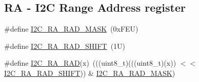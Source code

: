 \subsection*{RA -\/ I2C Range Address register}
\begin{DoxyCompactItemize}
\item 
\#define \mbox{\hyperlink{group___i2_c___register___masks_gaa39c37c0d41e4cdafc00884a2fc791fa}{I2\+C\+\_\+\+R\+A\+\_\+\+R\+A\+D\+\_\+\+M\+A\+SK}}~(0x\+F\+E\+U)
\item 
\#define \mbox{\hyperlink{group___i2_c___register___masks_ga8571ae2c33f4ea6503f568c2151ef2a9}{I2\+C\+\_\+\+R\+A\+\_\+\+R\+A\+D\+\_\+\+S\+H\+I\+FT}}~(1\+U)
\item 
\#define \mbox{\hyperlink{group___i2_c___register___masks_gae2a3d76c69fe5e8947660274f6744031}{I2\+C\+\_\+\+R\+A\+\_\+\+R\+AD}}(x)~(((uint8\+\_\+t)(((uint8\+\_\+t)(x)) $<$$<$ \mbox{\hyperlink{group___i2_c___register___masks_ga8571ae2c33f4ea6503f568c2151ef2a9}{I2\+C\+\_\+\+R\+A\+\_\+\+R\+A\+D\+\_\+\+S\+H\+I\+FT}})) \& \mbox{\hyperlink{group___i2_c___register___masks_gaa39c37c0d41e4cdafc00884a2fc791fa}{I2\+C\+\_\+\+R\+A\+\_\+\+R\+A\+D\+\_\+\+M\+A\+SK}})
\end{DoxyCompactItemize}
